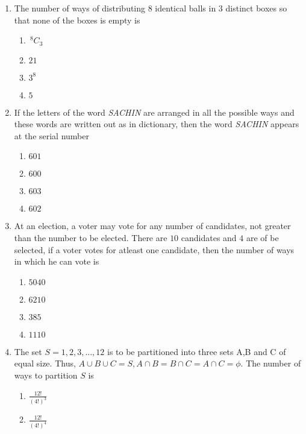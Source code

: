 \documentclass[journal,12pt,twocolumn]{IEEEtran}
\newcommand{\nCr}[2]{\,^{#1}C_{#2}}
\theoremstyle{remark}
\begin{document}
\begin{enumerate}
\item The number of ways of distributing 8 identical balls in $3$ distinct boxes so that none of the boxes is empty is \hfill {}
	\begin{multicols}{4}
		\begin{enumerate}
			\item $ \nCr{8}{3}$
     \item $21$
     \item $3^8$
     \item $5$
 \end{enumerate}
	\end{multicols}
\item If the letters of the word \emph{SACHIN} are arranged in all the possible ways and these words are written out as in dictionary, then the word \emph{SACHIN} appears at the serial number \hfill {}
	\begin{multicols}{4}
		\begin{enumerate}
     \item $601$
     \item $600$
     \item $603$
     \item $602$
 \end{enumerate}
	\end{multicols}
\item At an election, a voter may vote for any number of candidates, not greater than the number to be elected. There are $10$ candidates and $4$ are of be selected, if a voter votes for atleast one candidate, then the number of ways in which he can vote is \hfill{}
	\begin{multicols}{4}
        \begin{enumerate}
 \item $5040$
 \item $6210$
 \item $385$
 \item $1110$
        \end{enumerate}
	\end{multicols}
\item The set $S={1,2,3,...,12}$ is to be partitioned into three sets A,B and C of equal size. Thus, $A \cup B \cup C = S, A \cap B = B \cap C = A \cap C = \phi $. The number of ways to partition $S$ is \hfill{}
	\begin{multicols}{2}
	\begin{enumerate}
     \item $ \frac{12!}{(4!)^3}$
     \item $\frac{12!}{(4!)^4}$

\end{enumerate}
\end{multicols}
\end{enumerate}
\end{document}
